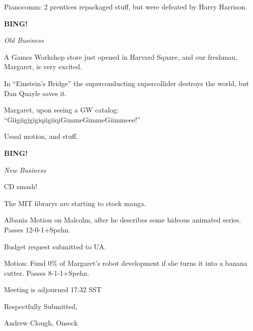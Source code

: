 \documentclass[12pt]{article}
\newcommand{\bing}{{\bf BING!} }
\newcommand{\goto}[1]{\bing \vskip 12pt \centerline{{\em{#1}}}}
\begin{document}
Pianocomm:  2 prentices repackaged stuff, but were defeated by Harry Harrison.

\goto{Old Business}

A Games Workshop store just opened in Harvard Square, and our freshman, Margaret, is very excited.

In ``Einstein's Bridge'' the superconducting supercollider destroys the world, but Dan Quayle saves it.

Margaret, upon seeing a GW catalog:  ``GiigiigigigiqiigiiqiGimmeGimmeGiimmeee!''

Usual motion, and stuff.

\goto{New Business}

CD smash!

The MIT librarys are starting to stock manga.

Albania Motion on Malcolm, after he describes some hideous animated series.  Passes 12-0-1+Spehn.

Budget request submitted to UA.

Motion:  Fund 0\% of Margaret's robot development if she turns it into a banana cutter.  Passes 8-1-1+Spehn.

Meeting is adjourned 17:32 SST

\vspace{18pt}
\begin{center}

Respectfully Submitted,

Andrew Clough, Onseck

\end{center}
\end{document}
